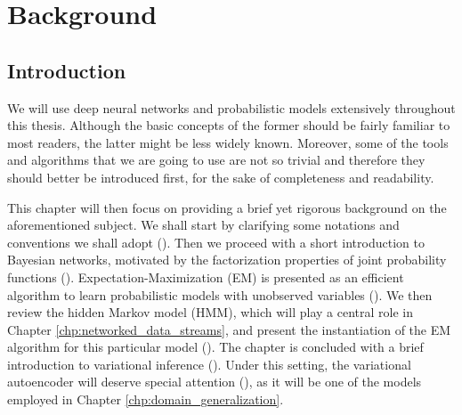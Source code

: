 
\chapter{Background}


\label{chp:background}


\section{Introduction}
\label{sec:background_intro}
We will use deep neural networks and probabilistic models extensively throughout this thesis. Although the basic concepts of the former should be fairly familiar to most readers, the latter might be less widely known. Moreover, some of the tools and algorithms that we are going to use are not so trivial and therefore they should better be introduced first, for the sake of completeness and readability.

This chapter will then focus on providing a brief yet rigorous background on the aforementioned subject. We shall start by clarifying some notations and conventions we shall adopt (). Then we proceed with a short introduction to Bayesian networks, motivated by the factorization properties of joint probability functions (\Secref{}). Expectation-Maximization (EM) is presented as an efficient algorithm to learn probabilistic models with unobserved variables (\Secref{}). We then review the hidden Markov model (HMM), which will play a central role in Chapter \ref{chp:networked_data_streams}, and present the instantiation of the EM algorithm for this particular model (\Secref{}). The chapter is concluded with a brief introduction to variational inference (\Secref{}). Under this setting, the variational autoencoder will deserve special attention (\Secref{}), as it will be one of the models employed in Chapter \ref{chp:domain_generalization}.

